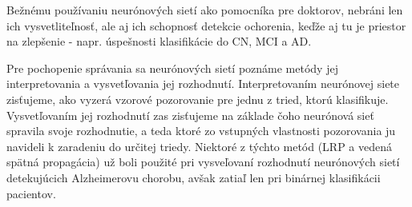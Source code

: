 Bežnému používaniu neurónových sietí ako pomocníka pre doktorov, nebráni len ich vysvetliteľnosť, ale aj ich schopnosť detekcie ochorenia, keďže aj tu je priestor na zlepšenie - napr. úspešnosti klasifikácie do CN, MCI a AD.

Pre pochopenie správania sa neurónových sietí poznáme metódy jej interpretovania a vysvetľovania jej rozhodnutí. Interpretovaním neurónovej siete zisťujeme, ako vyzerá vzorové pozorovanie pre jednu z tried, ktorú klasifikuje. Vysvetľovaním jej rozhodnutí zas zisťujeme na základe čoho neurónová sieť spravila svoje rozhodnutie, a teda ktoré zo vstupných vlastnosti pozorovania ju navideli k zaradeniu do určitej triedy. Niektoré z týchto metód (LRP a vedená spätná propagácia) už boli použité pri vysveľovaní rozhodnutí neurónových sietí detekujúcich Alzheimerovu chorobu, avšak zatiaľ len pri binárnej klasifikácii pacientov.

